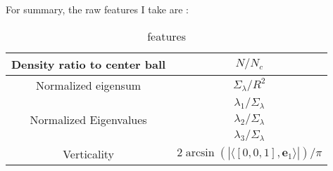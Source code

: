 \documentclass{article}
\begin{document}
For summary, the raw features I take are : 
\begin{table}[h!]
	\centering
	\begin{tabular}{| c | c |} 
		\hline
		Density ratio to center ball & $N / N_c$\\
		\hline
		Normalized eigensum & ${\Sigma_\lambda}/{R^2}$ \\ 
		\hline
		\multirow{3}{*}{Normalized Eigenvalues}
		& $\lambda_1/\Sigma_\lambda$ \\
		& $\lambda_2/\Sigma_\lambda$ \\
		& $\lambda_3/\Sigma_\lambda$ \\
		\hline
		Verticality & $2\arcsin(|\langle [0,0,1], \mathbf{e}_1\rangle|) / \pi$\\
		\hline
	\end{tabular}
	\caption{features}
	\label{table:2}
\end{table}



\end{document}
